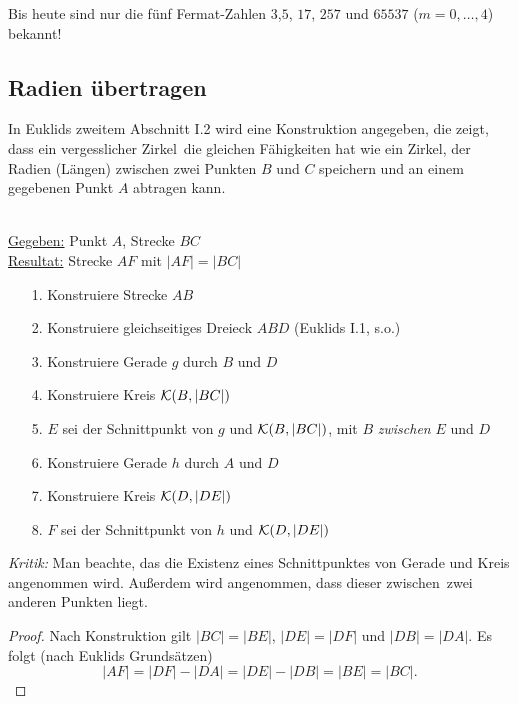 Bis heute sind nur die fünf Fermat-Zahlen $3$,$5$, $17$, $257$ und
$65537$ ($m=0,\ldots,4$) bekannt!



\subsection*{Radien übertragen}

In Euklids zweitem Abschnitt I.2 wird eine Konstruktion angegeben,
die zeigt, dass ein \glqq vergesslicher Zirkel\grqq\ die gleichen
Fähigkeiten hat wie ein Zirkel, der Radien (Längen) zwischen zwei
Punkten $B$ und $C$ speichern und an einem gegebenen Punkt $A$
abtragen kann.



\begin{konst}
\phantom{Pups}\hspace*{1cm}\phantom{Pups}\\
\underline{Gegeben:} Punkt $A$, Strecke $BC$ \\ 
\underline{Resultat:} Strecke $AF$ mit $|AF|=|BC|$
\begin{enumerate}
\item[1.] Konstruiere Strecke $AB$
\item[2.] Konstruiere gleichseitiges Dreieck $ABD$ (Euklids I.1, s.o.)
\item[3.] Konstruiere Gerade $g$ durch $B$ und $D$
\item[4.] Konstruiere Kreis ${\mathcal K}(B,|BC|)$ 
\item[5.] $E$ sei der Schnittpunkt von $g$ und ${\mathcal K}(B,|BC|)$, mit $B$
  {\em zwischen} $E$ und $D$
\item[6.] Konstruiere Gerade $h$ durch $A$ und $D$
\item[7.] Konstruiere Kreis ${\mathcal K}(D,|DE|)$ 
\item[8.] $F$ sei der Schnittpunkt von $h$ und ${\mathcal K}(D,|DE|)$
\end{enumerate}
\end{konst}

{\em Kritik:}
Man beachte, 
das die Existenz eines Schnittpunktes von Gerade und Kreis angenommen wird.
Außerdem wird angenommen, dass dieser \glqq zwischen\grqq\ zwei
anderen Punkten liegt.

\begin{proof}
Nach Konstruktion gilt $|BC|=|BE|$, $|DE|=|DF|$ und $|DB|=|DA|$.
Es folgt (nach Euklids \glqq Grundsätzen\grqq )
$$
|AF|=|DF|-|DA|= |DE|-|DB| = |BE| = |BC|.
$$
\end{proof}



